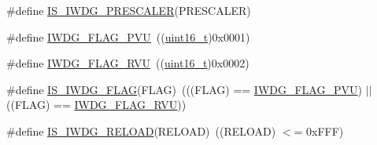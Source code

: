 \begin{DoxyCompactItemize}
\item 
\#define \hyperlink{group___i_w_d_g__prescaler_gab1e0695c1a22840d5be7c7fad283f4ba}{I\+S\+\_\+\+I\+W\+D\+G\+\_\+\+P\+R\+E\+S\+C\+A\+L\+ER}(P\+R\+E\+S\+C\+A\+L\+ER)
\item 
\#define \hyperlink{group___i_w_d_g___flag_gae20afcf399fad1534e79a8d30ea86c9c}{I\+W\+D\+G\+\_\+\+F\+L\+A\+G\+\_\+\+P\+VU}~((\hyperlink{_p_e___types_8h_a1f1825b69244eb3ad2c7165ddc99c956}{uint16\+\_\+t})0x0001)
\item 
\#define \hyperlink{group___i_w_d_g___flag_ga3731bf2711c234ffe5b405fb6634ebca}{I\+W\+D\+G\+\_\+\+F\+L\+A\+G\+\_\+\+R\+VU}~((\hyperlink{_p_e___types_8h_a1f1825b69244eb3ad2c7165ddc99c956}{uint16\+\_\+t})0x0002)
\item 
\#define \hyperlink{group___i_w_d_g___flag_ga5be9ae9ba267cf09a00523ef3e219293}{I\+S\+\_\+\+I\+W\+D\+G\+\_\+\+F\+L\+AG}(F\+L\+AG)~(((F\+L\+AG) == \hyperlink{openmotestm_2library_2inc_2stm32f10x__iwdg_8h_ae20afcf399fad1534e79a8d30ea86c9c}{I\+W\+D\+G\+\_\+\+F\+L\+A\+G\+\_\+\+P\+VU}) $\vert$$\vert$ ((F\+L\+AG) == \hyperlink{openmotestm_2library_2inc_2stm32f10x__iwdg_8h_a3731bf2711c234ffe5b405fb6634ebca}{I\+W\+D\+G\+\_\+\+F\+L\+A\+G\+\_\+\+R\+VU}))
\item 
\#define \hyperlink{group___i_w_d_g___flag_ga7c319e96bded8e3c38c6a42a1b335c68}{I\+S\+\_\+\+I\+W\+D\+G\+\_\+\+R\+E\+L\+O\+AD}(R\+E\+L\+O\+AD)~((R\+E\+L\+O\+AD) $<$= 0x\+F\+F\+F)
\end{DoxyCompactItemize}
